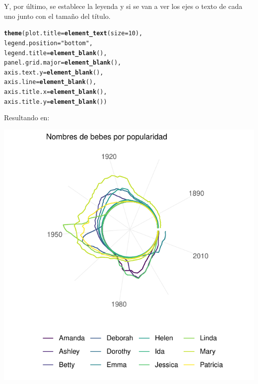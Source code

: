 \documentclass{article}\usepackage[]{graphicx}\usepackage[]{color}
\makeatletter
\def\maxwidth{ %
  \ifdim\Gin@nat@width>\linewidth
    \linewidth
  \else
    \Gin@nat@width
  \fi
}
\newcommand{\hlnum}[1]{\textcolor[rgb]{0.686,0.059,0.569}{#1}}%
\newcommand{\hlstr}[1]{\textcolor[rgb]{0.192,0.494,0.8}{#1}}%
\newcommand{\hlstd}[1]{\textcolor[rgb]{0.345,0.345,0.345}{#1}}%
\newcommand{\hlkwc}[1]{\textcolor[rgb]{0.333,0.667,0.333}{#1}}%
\newcommand{\hlkwd}[1]{\textcolor[rgb]{0.737,0.353,0.396}{\textbf{#1}}}%
\newenvironment{kframe}{%
 \def\at@end@of@kframe{}%
 \ifinner\ifhmode%
  \def\at@end@of@kframe{\end{minipage}}%
  \begin{minipage}{\columnwidth}%
 \fi\fi%
 \def\FrameCommand##1{\hskip\@totalleftmargin \hskip-\fboxsep
 \colorbox{shadecolor}{##1}\hskip-\fboxsep
     \hskip-\linewidth \hskip-\@totalleftmargin \hskip\columnwidth}%
 \MakeFramed {\advance\hsize-\width
   \@totalleftmargin\z@ \linewidth\hsize
   \@setminipage}}%
 {\par\unskip\endMakeFramed%
 \at@end@of@kframe}
\newenvironment{knitrout}{}{} %
\makeatother
\begin{document}
Y, por \'ultimo, se establece la leyenda y si se van a ver los ejes o texto de cada uno junto con el tama\~no del t\'itulo.
\begin{knitrout}
\color{fgcolor}\begin{kframe}
\begin{alltt}
  \hlkwd{theme}\hlstd{(}\hlkwc{plot.title} \hlstd{=} \hlkwd{element_text}\hlstd{(}\hlkwc{size}\hlstd{=}\hlnum{10}\hlstd{),}
        \hlkwc{legend.position} \hlstd{=} \hlstr{"bottom"}\hlstd{,}
        \hlkwc{legend.title} \hlstd{=} \hlkwd{element_blank}\hlstd{(),}
        \hlkwc{panel.grid.major} \hlstd{=} \hlkwd{element_blank}\hlstd{(),}
        \hlkwc{axis.text.y} \hlstd{=} \hlkwd{element_blank}\hlstd{(),}
        \hlkwc{axis.line} \hlstd{=} \hlkwd{element_blank}\hlstd{(),}
        \hlkwc{axis.title.x} \hlstd{=} \hlkwd{element_blank}\hlstd{(),}
        \hlkwc{axis.title.y} \hlstd{=} \hlkwd{element_blank}\hlstd{())}
\end{alltt}
\end{kframe}
\end{knitrout}
Resultando en:
\begin{knitrout}
\color{fgcolor}

{\centering \includegraphics[width=\maxwidth]{figure/plot_flow_gg_lineas-1} 

}



\end{knitrout}
\end{document}
